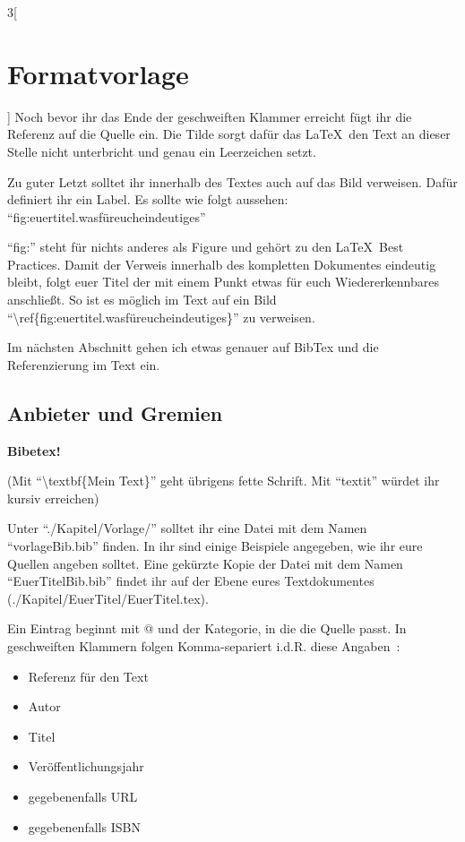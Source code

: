 \begin{multicols}{3}[\section{Formatvorlage}]
Noch bevor ihr das Ende der geschweiften Klammer erreicht fügt ihr die Referenz auf die Quelle ein. Die Tilde sorgt dafür das \LaTeX~den Text an dieser Stelle nicht unterbricht und genau ein Leerzeichen setzt. 

Zu guter Letzt solltet ihr innerhalb des Textes auch auf das Bild verweisen. Dafür definiert ihr ein Label. Es sollte wie folgt aussehen: \enquote{fig:euertitel.wasfüreucheindeutiges}

\enquote{fig:} steht für nichts anderes als Figure und gehört zu den \LaTeX~Best Practices. Damit der Verweis innerhalb des kompletten Dokumentes eindeutig bleibt, folgt euer Titel der mit einem Punkt etwas für euch Wiedererkennbares anschließt. So ist es möglich im Text auf ein Bild \enquote{\textbackslash ref\{fig:euertitel.wasfüreucheindeutiges\}} zu verweisen. 

Im nächsten Abschnitt gehen ich etwas genauer auf BibTex und die Referenzierung im Text ein.

\subsection*{Anbieter und Gremien}
\textbf{Bibetex!} 

(Mit \enquote{\textbackslash textbf\{Mein Text\}} geht übrigens fette Schrift. Mit \enquote{textit} würdet ihr kursiv erreichen)

Unter \enquote{./Kapitel/Vorlage/} solltet ihr eine Datei mit dem Namen \enquote{vorlageBib.bib} finden. In ihr sind einige Beispiele angegeben, wie ihr eure Quellen angeben solltet. Eine gekürzte Kopie der Datei mit dem Namen \enquote{EuerTitelBib.bib} findet ihr auf der Ebene eures Textdokumentes (./Kapitel/EuerTitel/EuerTitel.tex).

Ein Eintrag beginnt mit @ und der Kategorie, in die die Quelle passt. In geschweiften Klammern folgen Komma-separiert i.d.R. diese Angaben~\cite{vorlage.2}:

\begin{itemize}
	\item Referenz für den Text
	\item Autor 
	\item Titel
	\item Veröffentlichungsjahr
	\item gegebenenfalls URL
	\item gegebenenfalls ISBN
\end{itemize}

\end{multicols}
\newpage
